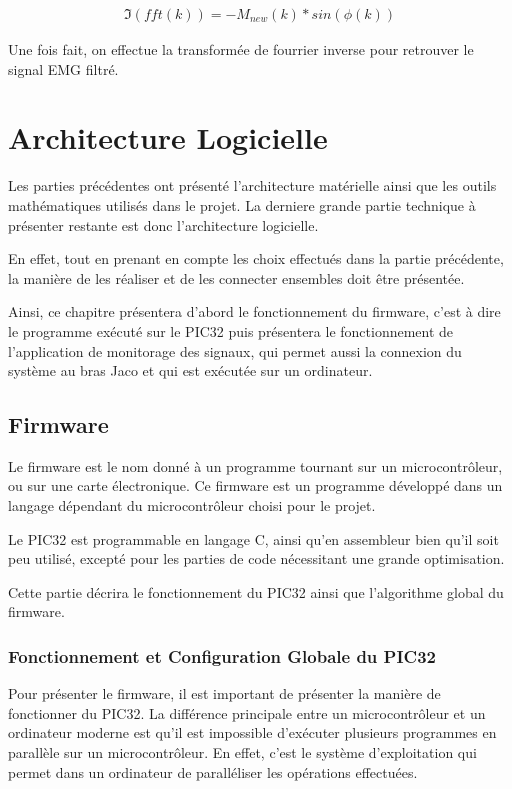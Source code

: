 \documentclass[letterpaper, twoside, 12pt, memoire, creativecommons, hyperref]{thETS}
\begin{document}
\begin{align}\label{eq:reconFiltre2}
   \Im(fft(k)) = -M_{new}(k) * sin(\phi(k))
\end{align}

Une fois fait, on effectue la transformée de fourrier inverse pour retrouver le signal EMG filtré.

\section{Architecture Logicielle}

Les parties précédentes ont présenté l'architecture matérielle ainsi que les outils mathématiques utilisés dans le projet. La derniere grande partie technique à présenter restante est donc l'architecture logicielle. 

En effet, tout en prenant en compte les choix effectués dans la partie précédente, la manière de les réaliser et de les connecter ensembles doit être présentée. 

Ainsi, ce chapitre présentera d'abord le fonctionnement du firmware, c'est à dire le programme exécuté sur le PIC32 puis présentera le fonctionnement de l'application de monitorage des signaux, qui permet aussi la connexion du système au bras Jaco et qui est exécutée sur un ordinateur. 

\subsection{Firmware}

Le firmware est le nom donné à un programme tournant sur un microcontrôleur, ou sur une carte électronique. Ce firmware est un programme développé dans un langage dépendant du microcontrôleur choisi pour le projet. 

Le PIC32 est programmable en langage C, ainsi qu'en assembleur bien qu'il soit peu utilisé, excepté pour les parties de code nécessitant une grande optimisation. 

Cette partie décrira le fonctionnement du PIC32 ainsi que l'algorithme global du firmware. 

\subsubsection{Fonctionnement et Configuration Globale du PIC32}

Pour présenter le firmware, il est important de présenter la manière de fonctionner du PIC32. La différence principale entre un microcontrôleur et un ordinateur moderne est qu'il est impossible d'exécuter plusieurs programmes en parallèle sur un microcontrôleur. En effet, c'est le système d'exploitation qui permet dans un ordinateur de paralléliser les opérations effectuées. 
\end{document}
